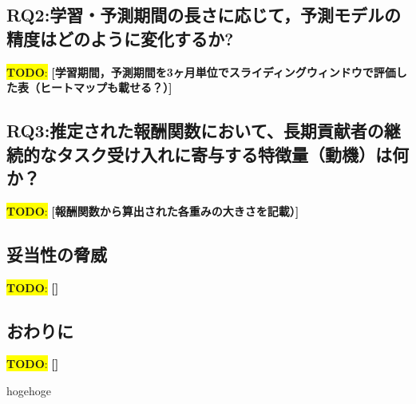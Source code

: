 \documentclass[submit,techrep,noauthor]{ipsj}
\newcommand{\todo}[1]{\colorbox{yellow}{{\bf TODO}:}{\color{red} {\textbf{[#1]}}}}
\begin{document}
\subsection{RQ2:学習・予測期間の長さに応じて，予測モデルの精度はどのように変化するか?}
\todo{学習期間，予測期間を3ヶ月単位でスライディングウィンドウで評価した表（ヒートマップも載せる？）}
\subsection{RQ3:推定された報酬関数において、長期貢献者の継続的なタスク受け入れに寄与する特徴量（動機）は何か？}
\todo{報酬関数から算出された各重みの大きさを記載）}

\subsection{妥当性の脅威}
\todo{}

\subsection{おわりに}
\todo{}

\begin{acknowledgment}
hogehoge
\end{acknowledgment}




\end{document}
